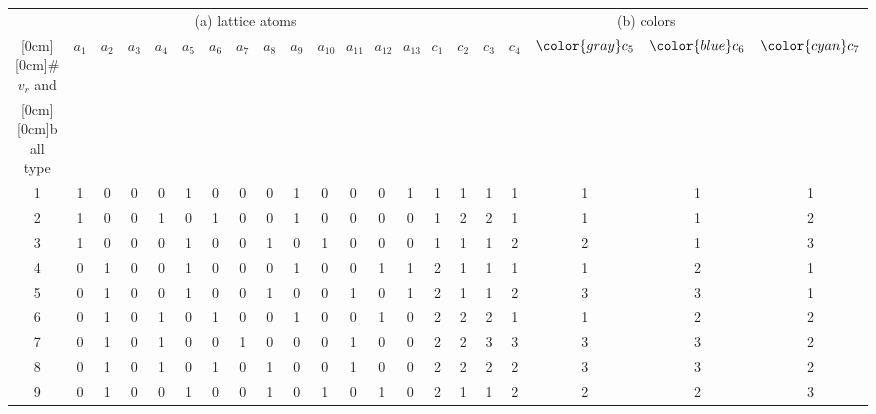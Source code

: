 \begin{table}
{\footnotesize
\begin{center}
{ {\footnotesize
\setlength{\tabcolsep}{3pt}
\begin{tabular}{ c ccccccccccccc ccccccc }
\hline\hline
&\multicolumn{13}{c}{(a) lattice atoms}&\multicolumn{7}{c}{(b) colors}\\
\raisebox{1.5ex}[0cm][0cm]{\# $v_r$ and}&$a_1$&$a_2$&$a_3$&$a_4$&$a_5$&$a_6$&$a_7$&$a_8$&$a_9$&$a_{10}$&$a_{11}$&$a_{12}$&$a_{13}$&\color{green}$c_1$&\color{red}$c_2$&\color{orange}$c_3$&\color{magenta}$c_4$&$\color{gray}c_5$&$\color{blue}c_6$&$\color{cyan}c_7$\\
\raisebox{1.5ex}[0cm][0cm]{ball type}&&&&&&&&&&&&&&&&&&&&\\
\hline
1  &1&0&0&0&1&0&0&0&1&0&0&0&1&  \color{green}1&\color{red}1&\color{orange} 1&\color{magenta} 1&\color{gray} 1&\color{blue} 1&\color{cyan}1          \\
2  &1&0&0&1&0&1&0&0&1&0&0&0&0&  \color{green}1&\color{red}2&\color{orange} 2&\color{magenta} 1&\color{gray} 1&\color{blue} 1&\color{cyan}2           \\
3  &1&0&0&0&1&0&0&1&0&1&0&0&0&  \color{green}1&\color{red}1&\color{orange} 1&\color{magenta} 2&\color{gray} 2&\color{blue} 1&\color{cyan}3          \\
4  &0&1&0&0&1&0&0&0&1&0&0&1&1&  \color{green}2&\color{red}1&\color{orange} 1&\color{magenta} 1&\color{gray} 1&\color{blue} 2&\color{cyan}1          \\
5  &0&1&0&0&1&0&0&1&0&0&1&0&1&  \color{green}2&\color{red}1&\color{orange} 1&\color{magenta} 2&\color{gray} 3&\color{blue} 3&\color{cyan}1          \\
6  &0&1&0&1&0&1&0&0&1&0&0&1&0&  \color{green}2&\color{red}2&\color{orange} 2&\color{magenta} 1&\color{gray} 1&\color{blue} 2&\color{cyan}2           \\
7  &0&1&0&1&0&0&1&0&0&0&1&0&0&  \color{green}2&\color{red}2&\color{orange} 3&\color{magenta} 3&\color{gray} 3&\color{blue} 3&\color{cyan}2           \\
8  &0&1&0&1&0&1&0&1&0&0&1&0&0&  \color{green}2&\color{red}2&\color{orange} 2&\color{magenta} 2&\color{gray} 3&\color{blue} 3&\color{cyan}2           \\
9  &0&1&0&0&1&0&0&1&0&1&0&1&0&  \color{green}2&\color{red}1&\color{orange} 1&\color{magenta} 2&\color{gray} 2&\color{blue} 2&\color{cyan}3          \\

\end{tabular}}}
\end{center}}
\end{table}
